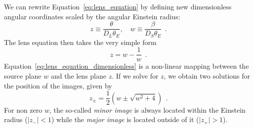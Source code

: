\documentclass[12pt,dvipsnames]{report}
\newcommand{\hquad}{~~}
\begin{document}
We can rewrite Equation~\ref{eq:lens_equation} by defining new dimensionless
angular coordinates scaled by the angular Einstein radius:
\begin{equation}
    z\equiv \frac{\theta}{D_L\theta_E}, \quad w\equiv\frac{\beta}{D_S\theta_E}
    \hquad.
\end{equation}
The lens equation then takes the very simple form
\begin{equation}
    z= w- \frac{ 1}{w}
    \hquad.
    \label{eq:lens_equation_dimensionless}
\end{equation}
Equation~\ref{eq:lens_equation_dimensionless} is a non-linear mapping between the
source plane $w$ and the lens plane $z$.
If we solve for $z$, we obtain two solutions for the position of the images, given by
\begin{equation}
    z_\pm= \frac{1}{2} \left( w\pm\sqrt{w^2 +4}\right)
    \hquad.
    \label{eq:images_location}
\end{equation}
For non zero $w$, the so-called \emph{minor image} is always located
within the Einstein radius ($\lvert z_-\rvert<1$) while the \emph{major image}
is located outside of it ($\lvert z_+\rvert>1$).
\end{document}
